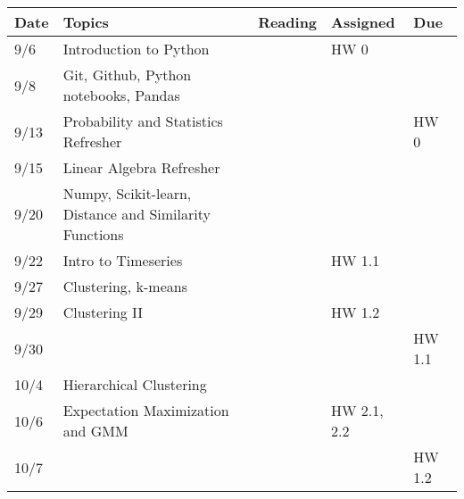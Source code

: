 \documentclass[11pt]{article}
\begin{document}
\small
\begin{centering}
\begin{tabular}{||l|p{3in}|l|l|l||}
\hline\hline
Date & Topics  & Reading & Assigned & Due  \\
\hline\hline
9/6 & Introduction to Python &  &  HW 0 & \\
9/8 & Git, Github, Python notebooks, Pandas & & & \\

\hline
9/13 & Probability and Statistics Refresher & &  & HW 0 \\
9/15 & Linear Algebra Refresher & & & \\
\hline
 9/20 & Numpy, Scikit-learn, Distance and Similarity Functions & &  & \\
9/22 & Intro to Timeseries & & HW 1.1& \\ 
\hline

9/27 & Clustering, k-means & & & \\
9/29 & Clustering II & &HW 1.2  & \\ 
9/30 &&&& HW 1.1 \\
\hline

10/4 & Hierarchical Clustering & & & \\  
10/6 & Expectation Maximization and GMM & & HW 2.1, 2.2 & \\ 
10/7 &&&& HW 1.2 \\
\hline


\end{tabular}
\end{centering}
\end{document}
